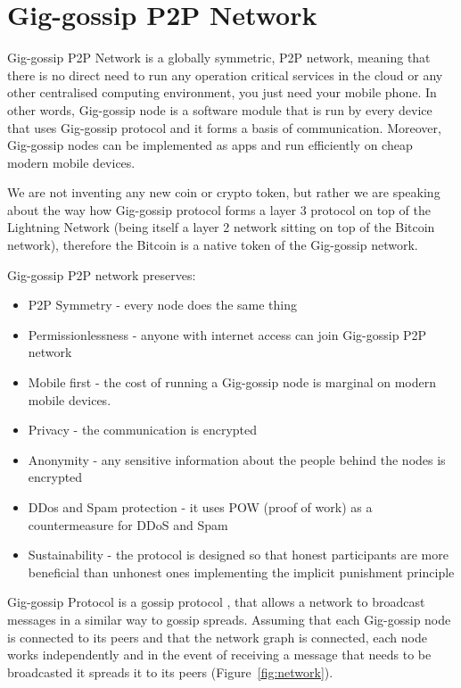 \documentclass{article}
\begin{document}
\section{Gig-gossip P2P Network}
Gig-gossip P2P Network is a globally symmetric, P2P network, meaning that there is no direct need to run any operation critical services in the cloud or any other centralised computing environment, you just need your mobile phone. In other words, Gig-gossip node is a software module that is run by every device that uses Gig-gossip protocol and it forms a basis of communication. Moreover, Gig-gossip nodes can be implemented as apps and run efficiently on cheap modern mobile devices. 

We are not inventing any new coin or crypto token, but rather we are speaking about the way how Gig-gossip protocol forms a layer 3 protocol on top of the Lightning Network (being itself a layer 2 network sitting on top of the Bitcoin network), therefore the Bitcoin is a native token of the Gig-gossip network.

Gig-gossip P2P network preserves:
\begin{itemize}
\item P2P Symmetry - every node does the same thing
\item Permissionlessness - anyone with internet access can join Gig-gossip P2P network
\item Mobile first - the cost of running a Gig-gossip node is marginal on modern mobile devices. 
\item Privacy - the communication is encrypted
\item Anonymity - any sensitive information about the people behind the nodes is encrypted
\item DDos and Spam protection - it uses POW (proof of work) as a countermeasure for DDoS and Spam
\item Sustainability - the protocol is designed so that honest participants are more beneficial than unhonest ones implementing the implicit punishment principle
\end{itemize}

Gig-gossip Protocol is a gossip protocol \cite{Fanout}, that allows a network to broadcast messages in a similar way to gossip spreads. Assuming that each Gig-gossip node is connected to its peers and that the network graph is connected, each node works independently and in the event of receiving a message that needs to be broadcasted it spreads it to its peers (Figure~\ref{fig:network}). 
\end{document}
